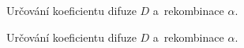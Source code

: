\documentclass{protokol}
\newcommand\diffuse{D}
\newcommand\recomb{\alpha}
\begin{document}
\header

\newcommand\plotfit[1]{%
}

\begin{figure}[htp]
	\centering
	\plotfit{10}
	\plotfit{20}
	\plotfit{50}
	\plotfit{100}%
	\label{fig:argon}
	\caption{Určování koeficientu difuze $\diffuse$ a~rekombinace $\recomb$.}
\end{figure}

\begin{figure}[htp]
	\centering
	\plotfit{200}
	\plotfit{300}
	\plotfit{380}%
	\label{fig:argon}
	\caption{Určování koeficientu difuze $\diffuse$ a~rekombinace $\recomb$.}
\end{figure}
\end{document}
